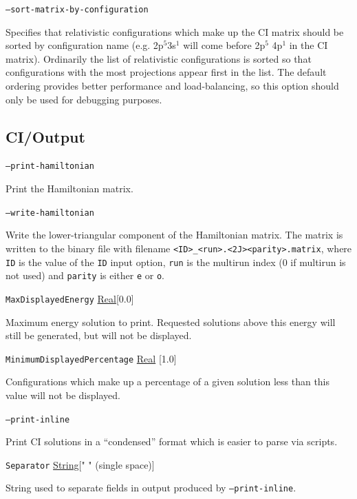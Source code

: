 \documentclass{report}
\begin{document}
\texttt{--sort-matrix-by-configuration}
\begin{adjustwidth}{1cm}{}
Specifies that relativistic configurations which make up the CI matrix should be sorted by configuration
name (e.g. 2p$^5$3s$^1$ will come before 2p$^5$ 4p$^1$ in the CI matrix). Ordinarily the list of
relativistic configurations is sorted so that configurations with the most projections appear first in
the list. The default ordering provides better performance and load-balancing, so this option should
only be used for debugging purposes.
\end{adjustwidth}

\subsection{CI/Output}

\texttt{--print-hamiltonian}
\begin{adjustwidth}{1cm}{}
Print the Hamiltonian matrix. 
\end{adjustwidth}

\texttt{--write-hamiltonian}
\begin{adjustwidth}{1cm}{}
Write the lower-triangular component of the Hamiltonian matrix. The matrix is written to the binary file
with filename \texttt{<ID>\_<run>.<2J><parity>.matrix}, where \texttt{ID} is the value of the 
\texttt{ID} input option, \texttt{run} is the multirun index (0 if multirun is not used) and
\texttt{parity} is either \texttt{e} or \texttt{o}.
\end{adjustwidth}

\texttt{MaxDisplayedEnergy} \uline{Real}[0.0]
\begin{adjustwidth}{1cm}{}
Maximum energy solution to print. Requested solutions above this energy will still be generated, but
will not be displayed.
\end{adjustwidth}

\texttt{MinimumDisplayedPercentage} \uline{Real} [1.0]
\begin{adjustwidth}{1cm}{}
Configurations which make up a percentage of a given solution less than this value will not be
displayed.
\end{adjustwidth}

\texttt{--print-inline}
\begin{adjustwidth}{1cm}{}
Print CI solutions in a ``condensed'' format which is easier to parse via scripts.
\end{adjustwidth}

\texttt{Separator} \uline{String}[" " (single space)]
\begin{adjustwidth}{1cm}{}
String used to separate fields in output produced by \texttt{--print-inline}.
\end{adjustwidth}
\end{document}
